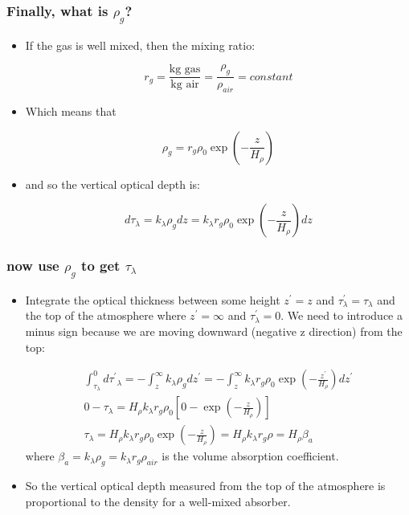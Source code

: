 \documentclass[hyperref={colorlinks=true,linkcolor=blue,urlcolor=blue},numbers]{beamer}
\begin{document}
\begin{frame}
  \frametitle{Finally, what is $\rho_g$?}

  \begin{itemize}
  \item If the gas is well mixed, then the mixing ratio:

    \begin{equation*}
      r_{g} = \frac{\text{kg gas} }{\text{kg air}} = \frac{ \rho_g}{\rho_{air}} = constant
    \end{equation*}

  \item Which means that

    \begin{equation*}
      \rho_g = r_{g} \rho_0 \exp \left (- \frac{z }{H_\rho} \right )
    \end{equation*}

  \item and so the vertical optical depth is:

    \begin{equation*}
      d\tau_\lambda = k_\lambda \rho_g dz = k_\lambda r_{g} \rho_0 \exp \left (- \frac{z }{H_\rho} \right ) dz
    \end{equation*}
  \end{itemize}
\end{frame}

\begin{frame}
  \frametitle{ now use $\rho_g$ to get $\tau_\lambda$}
  \begin{itemize}
  \item Integrate the optical thickness between some height $z^\prime =z$ 
and $\tau^\prime_\lambda = \tau_\lambda$ and the top of the atmosphere
where $z^\prime=\infty$ and $\tau^\prime_\lambda = 0$.  We need to introduce a minus sign
because we are moving downward (negative z direction) from the top:

\begin{gather*}
  \int_{\tau_\lambda}^0 d{\tau^\prime}_\lambda = -\int_z^\infty k_\lambda \rho_g dz^\prime = 
-\int_z^\infty k_\lambda r_{g} \rho_0 \exp \left (- \frac{z^\prime }{H_\rho} \right ) dz^\prime\\
0 - \tau_\lambda = H_\rho k_\lambda r_g \rho_0 \left [ 0 - \exp \left (- \frac{z }{H_\rho} \right ) \right ] \\
 \tau_\lambda = H_\rho k_\lambda r_g \rho_0 \exp \left (- \frac{z }{H_\rho} \right ) =
 H_\rho k_\lambda r_g \rho =  H_\rho \beta_a
  \end{gather*}
where $\beta_a = k_\lambda \rho_g =k_\lambda r_g \rho_{air}$ is the volume absorption coefficient.

\item So the vertical optical depth measured from the top of the atmosphere is proportional to the density
for a well-mixed absorber.




  \end{itemize}


\end{frame}
\end{document}
